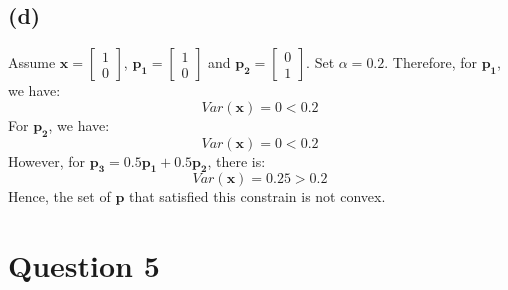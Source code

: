 \documentclass[10pt,a4paper]{article}
\begin{document}
\subsection*{(d)}
Assume $\mathbf{x} = \begin{bmatrix}
1 \\
0
\end{bmatrix}$, $\mathbf{p_{1}} = \begin{bmatrix}
1 \\
0
\end{bmatrix}$ and $\mathbf{p_{2}} = \begin{bmatrix}
0 \\
1
\end{bmatrix}$. Set $\alpha = 0.2$. Therefore, for $\mathbf{p_{1}}$, we have:
\begin{equation*}
	Var(\mathbf{x}) = 0 < 0.2
\end{equation*}
For $\mathbf{p_{2}}$, we have:
\begin{equation*}
	Var(\mathbf{x}) = 0 < 0.2
\end{equation*}
However, for $\mathbf{p_{3}} = 0.5 \mathbf{p_{1}} + 0.5 \mathbf{p_{2}}$, there is:
\begin{equation*}
	Var(\mathbf{x}) = 0.25 > 0.2
\end{equation*}
Hence, the set of $\mathbf{p}$ that satisfied this constrain is not convex.

\section*{Question 5}
\end{document}
